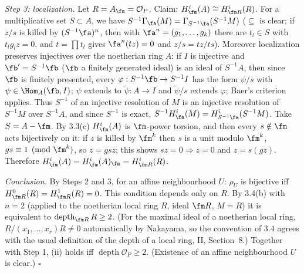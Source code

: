 \documentclass[11pt]{article}
\begin{document}
\emph{Step 3: localization.} Let $R=A_{\fm}=\mathcal O_P$. Claim: $H^i_{\fm}(A)\cong H^i_{\fm R}(R)$. For a multiplicative set $S\subset A$, we have $S^{-1}\Gamma_{\fa}(M)=\Gamma_{S^{-1}\fa}(S^{-1}M)$ ($\subseteq$ is clear; if $z/s$ is killed by $(S^{-1}\fa)^n$, then with $\fa^n=(g_1,\dots,g_k)$ there are $t_l\in S$ with $t_lg_lz=0$, and $t=\prod t_l$ gives $\fa^n(tz)=0$ and $z/s=tz/ts$). Moreover localization preserves injectives over the noetherian ring $A$: if $I$ is injective and $\fb'=S^{-1}\fb$ ($\fb$ a finitely generated ideal) is an ideal of $S^{-1}A$, then since $\fb$ is finitely presented, every $\varphi:S^{-1}\fb\to S^{-1}I$ has the form $\psi/s$ with $\psi\in\Hom_A(\fb,I)$; $\psi$ extends to $\tilde\psi:A\to I$ and $\tilde\psi/s$ extends $\varphi$; Baer's criterion applies. Thus $S^{-1}$ of an injective resolution of $M$ is an injective resolution of $S^{-1}M$ over $S^{-1}A$, and since $S^{-1}$ is exact, $S^{-1}H^i_{\fa}(M)=H^i_{S^{-1}\fa}(S^{-1}M)$. Take $S=A-\fm$. By 3.3(c) $H^i_{\fm}(A)$ is $\fm$-power torsion, and then every $s\notin\fm$ acts bijectively on it: if $z$ is killed by $\fm^k$ then $s$ is a unit modulo $\fm^k$, $gs\equiv1\pmod{\fm^k}$, so $z=gsz$; this shows $sz=0\Rightarrow z=0$ and $z=s(gz)$. Therefore $H^i_{\fm}(A)=H^i_{\fm}(A)_{\fm}=H^i_{\fm R}(R)$.

\emph{Conclusion.} By Steps 2 and 3, for an affine neighbourhood $U$: $\rho_U$ is bijective iff $H^0_{\fm R}(R)=H^1_{\fm R}(R)=0$. This condition depends only on $R$. By 3.4(b) with $n=2$ (applied to the noetherian local ring $R$, ideal $\fm R$, $M=R$) it is equivalent to $\operatorname{depth}_{\fm R}R\ge2$. (For the maximal ideal of a noetherian local ring, $R/(x_1,\dots,x_r)R\neq0$ automatically by Nakayama, so the convention of 3.4 agrees with the usual definition of the depth of a local ring, II, Section~8.) Together with Step 1, (ii) holds iff $\operatorname{depth}\mathcal O_P\ge2$. (Existence of an affine neighbourhood $U$ is clear.) \hfill$\square$
\end{document}
